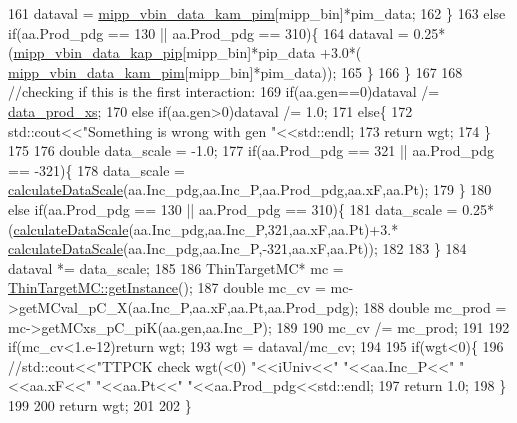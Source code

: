 \begin{DoxyCode}
161         dataval = \hyperlink{class_neutrino_flux_reweight_1_1_thin_targetp_c_kaon_reweighter_ab268b6554b6abe96854cec82f336816d}{mipp\_vbin\_data\_kam\_pim}[mipp\_bin]*pim\_data;
162       \}
163       \textcolor{keywordflow}{else} \textcolor{keywordflow}{if}(aa.Prod\_pdg == 130 || aa.Prod\_pdg == 310)\{
164         dataval = 0.25*(\hyperlink{class_neutrino_flux_reweight_1_1_thin_targetp_c_kaon_reweighter_a6ad9b6cccb6fc522708b1aa5b9070c71}{mipp\_vbin\_data\_kap\_pip}[mipp\_bin]*pip\_data +3.0*(
      \hyperlink{class_neutrino_flux_reweight_1_1_thin_targetp_c_kaon_reweighter_ab268b6554b6abe96854cec82f336816d}{mipp\_vbin\_data\_kam\_pim}[mipp\_bin]*pim\_data));
165       \}
166     \}
167          
168     \textcolor{comment}{//checking if this is the first interaction:}
169     \textcolor{keywordflow}{if}(aa.gen==0)dataval /= \hyperlink{class_neutrino_flux_reweight_1_1_thin_targetp_c_kaon_reweighter_ae26e9fbd1c42a53759a1587a3312a4fb}{data\_prod\_xs};
170     \textcolor{keywordflow}{else} \textcolor{keywordflow}{if}(aa.gen>0)dataval /= 1.0;
171     \textcolor{keywordflow}{else}\{
172       std::cout<<\textcolor{stringliteral}{"Something is wrong with gen "}<<std::endl;
173       \textcolor{keywordflow}{return} wgt;
174     \}
175 
176     \textcolor{keywordtype}{double} data\_scale = -1.0;
177     \textcolor{keywordflow}{if}(aa.Prod\_pdg == 321 || aa.Prod\_pdg == -321)\{
178       data\_scale = \hyperlink{class_neutrino_flux_reweight_1_1_thin_targetp_c_kaon_reweighter_a60ee6eb8b7a376145a4ec0780a0d812d}{calculateDataScale}(aa.Inc\_pdg,aa.Inc\_P,aa.Prod\_pdg,aa.xF,aa.Pt);   
179     \}
180     \textcolor{keywordflow}{else} \textcolor{keywordflow}{if}(aa.Prod\_pdg == 130 || aa.Prod\_pdg == 310)\{
181       data\_scale = 0.25*(\hyperlink{class_neutrino_flux_reweight_1_1_thin_targetp_c_kaon_reweighter_a60ee6eb8b7a376145a4ec0780a0d812d}{calculateDataScale}(aa.Inc\_pdg,aa.Inc\_P,321,aa.xF,aa.Pt)+3.*
      \hyperlink{class_neutrino_flux_reweight_1_1_thin_targetp_c_kaon_reweighter_a60ee6eb8b7a376145a4ec0780a0d812d}{calculateDataScale}(aa.Inc\_pdg,aa.Inc\_P,-321,aa.xF,aa.Pt));  
182       
183     \}
184     dataval *= data\_scale;
185 
186     ThinTargetMC*  mc =  \hyperlink{class_neutrino_flux_reweight_1_1_thin_target_m_c_a2a114747fed2677cd3b7213555c002b9}{ThinTargetMC::getInstance}();
187     \textcolor{keywordtype}{double} mc\_cv   = mc->getMCval\_pC\_X(aa.Inc\_P,aa.xF,aa.Pt,aa.Prod\_pdg);
188     \textcolor{keywordtype}{double} mc\_prod = mc->getMCxs\_pC\_piK(aa.gen,aa.Inc\_P);
189 
190     mc\_cv /= mc\_prod;
191 
192     \textcolor{keywordflow}{if}(mc\_cv<1.e-12)\textcolor{keywordflow}{return} wgt;
193     wgt = dataval/mc\_cv;
194 
195     \textcolor{keywordflow}{if}(wgt<0)\{
196       \textcolor{comment}{//std::cout<<"TTPCK check wgt(<0) "<<iUniv<<" "<<aa.Inc\_P<<" "<<aa.xF<<" "<<aa.Pt<<"
       "<<aa.Prod\_pdg<<std::endl;}
197       \textcolor{keywordflow}{return} 1.0;
198     \}
199     
200     \textcolor{keywordflow}{return} wgt;
201     
202   \}
\end{DoxyCode}
